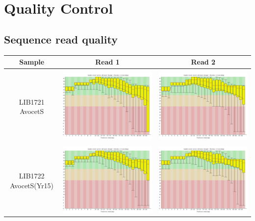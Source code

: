 \chapter[Quality control]{Quality Control}

\section{Sequence read quality}
 \label{App:AppendixQCRead}
 
\begin{center}
\begin{tabular}{ccc}
\toprule
Sample  & Read 1 & Read 2 \\ \midrule 
\\
\begin{sideways}LIB1721 AvocetS\end{sideways} & \includegraphics[width=0.4 \textwidth]{Appendices/images/Sample_LIB1721_base_quality_R1.png} & \includegraphics[width=0.4 \textwidth]{Appendices/images/Sample_LIB1721_base_quality_R2.png} \\ \midrule  \\
\begin{sideways}LIB1722 AvocetS(Yr15)\end{sideways} & \includegraphics[width=0.4 \textwidth]{Appendices/images/Sample_LIB1722_base_quality_R1.png} & \includegraphics[width=0.4 \textwidth]{Appendices/images/Sample_LIB1722_base_quality_R2.png} \\   

\end{tabular}
\end{center}
